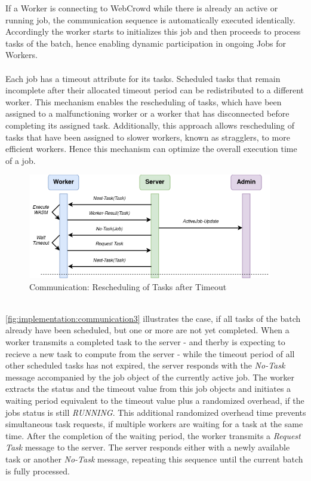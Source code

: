 If a Worker is connecting to WebCrowd while there is already an active or running job, the communication sequence is automatically executed identically. Accordingly the worker starts to initializes this job and then proceeds to process tasks of the batch, hence enabling dynamic participation in ongoing Jobs for Workers.
\\~\\
Each job has a timeout attribute for its tasks. Scheduled tasks that remain incomplete after their allocated timeout period can be redistributed to a different worker. This mechanism enables the rescheduling of tasks, which have been assigned to a malfunctioning worker or a worker that has disconnected before completing its assigned task. Additionally, this approach allows rescheduling of tasks that have been assigned to slower workers, known as stragglers, to more efficient workers. Hence this mechanism can optimize the overall execution time of a job.
\begin{figure}[htbp]
    \centering
    \includegraphics[width=0.95\textwidth]{gfx/figures/communication-timeout.png}
    \caption{Communication: Rescheduling of Tasks after Timeout}
    \label{fig:implementation:communication3}
\end{figure}
~\\
\autoref{fig:implementation:communication3} illustrates the case, if all tasks of the batch already have been scheduled, but one or more are not yet completed. When a worker transmits a completed task to the server - and therby is expecting to recieve a new task to compute from the server - while the timeout period of all other scheduled tasks has not expired, the server responds with the \emph{No-Task} message accompanied by the job object of the currently active job. The worker extracts the status and the timeout value from this job objects and initiates a waiting period equivalent to the timeout value plus a randomized overhead, if the jobs status is still \emph{RUNNING}. This additional randomized overhead time prevents simultaneous task requests, if multiple workers are waiting for a task at the same time. After the completion of the waiting period, the worker transmits a \emph{Request Task} message to the server. The server responds either with a newly available task or another \emph{No-Task} message, repeating this sequence until the current batch is fully processed.

